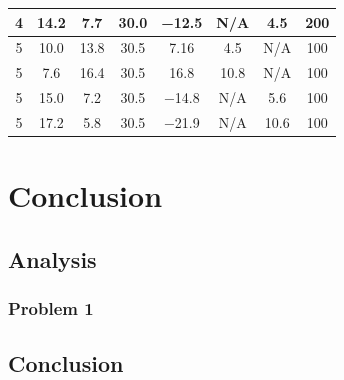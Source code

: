\documentclass[12 pt]{report}
\begin{document}
\begin{table}[!htbp]
\begin{center}
\begin{tabular}{|c|c|c|c|c|c|c|c|}
		\hline
		\num{4}&\num{14.2}&\num{7.7}&\num{30.0}&\num{-12.5}&N/A&\num{4.5}&\num{200}\\
		\hline
		\num{5}&\num{10.0}&\num{13.8}&\num{30.5}&\num{7.16}&\num{4.5}&N/A&\num{100}\\
		\hline
		\num{5}&\num{7.6}&\num{16.4}&\num{30.5}&\num{16.8}&\num{10.8}&N/A&\num{100}\\
		\hline
		\num{5}&\num{15.0}&\num{7.2}&\num{30.5}&\num{-14.8}&N/A&\num{5.6}&\num{100}\\
		\hline
		\num{5}&\num{17.2}&\num{5.8}&\num{30.5}&\num{-21.9}&N/A&\num{10.6}&\num{100}\\
		\hline
	\end{tabular}
\end{center}
\label{tbl:data}
\end{table}

\chapter{Conclusion} \label{conclusion-chapter}
\section{Analysis} \label{analysis}
\subsection{Problem 1}


\section{Conclusion} \label{conclusion-section}

\printbibliography[heading=subbibintoc]
\appendix
\end{document}

